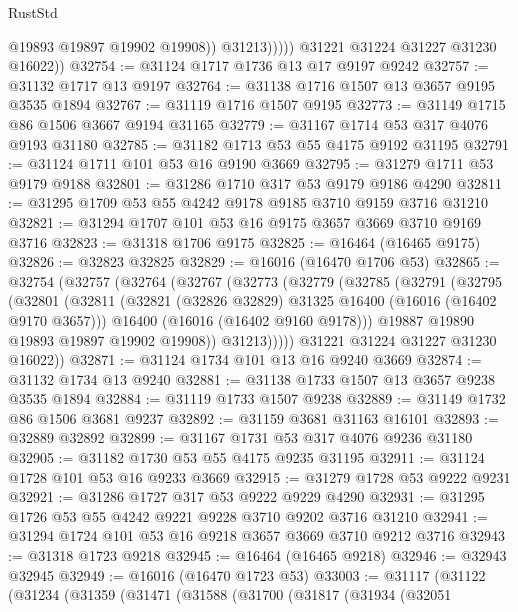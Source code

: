 \begin{lexlean}{RustStd}
\begin{coremodule}
                      @19893
                      @19897
                      @19902
                      @19908))
                  @31213)))))
        @31221
        @31224
        @31227
        @31230
        @16022))
@32754 := @31124 @1717 @1736 @13 @17 @9197 @9242
@32757 := @31132 @1717 @13 @9197
@32764 := @31138 @1716 @1507 @13 @3657 @9195 @3535 @1894
@32767 := @31119 @1716 @1507 @9195
@32773 := @31149 @1715 @86 @1506 @3667 @9194 @31165
@32779 := @31167 @1714 @53 @317 @4076 @9193 @31180
@32785 := @31182 @1713 @53 @55 @4175 @9192 @31195
@32791 := @31124 @1711 @101 @53 @16 @9190 @3669
@32795 := @31279 @1711 @53 @9179 @9188
@32801 := @31286 @1710 @317 @53 @9179 @9186 @4290
@32811 := @31295 @1709 @53 @55 @4242 @9178 @9185 @3710 @9159 @3716 @31210
@32821 := @31294 @1707 @101 @53 @16 @9175 @3657 @3669 @3710 @9169 @3716
@32823 := @31318 @1706 @9175
@32825 := @16464 (@16465 @9175)
@32826 := @32823 @32825
@32829 := @16016 (@16470 @1706 @53)
@32865 := @32754
    (@32757
      (@32764
        (@32767
          (@32773
            (@32779
              (@32785
                (@32791
                  (@32795
                    (@32801
                      (@32811
                        (@32821 (@32826 @32829) @31325 @16400 (@16016 (@16402 @9170 @3657)))
                        @16400
                        (@16016 (@16402 @9160 @9178)))
                      @19887
                      @19890
                      @19893
                      @19897
                      @19902
                      @19908))
                  @31213)))))
        @31221
        @31224
        @31227
        @31230
        @16022))
@32871 := @31124 @1734 @101 @13 @16 @9240 @3669
@32874 := @31132 @1734 @13 @9240
@32881 := @31138 @1733 @1507 @13 @3657 @9238 @3535 @1894
@32884 := @31119 @1733 @1507 @9238
@32889 := @31149 @1732 @86 @1506 @3681 @9237
@32892 := @31159 @3681 @31163 @16101
@32893 := @32889 @32892
@32899 := @31167 @1731 @53 @317 @4076 @9236 @31180
@32905 := @31182 @1730 @53 @55 @4175 @9235 @31195
@32911 := @31124 @1728 @101 @53 @16 @9233 @3669
@32915 := @31279 @1728 @53 @9222 @9231
@32921 := @31286 @1727 @317 @53 @9222 @9229 @4290
@32931 := @31295 @1726 @53 @55 @4242 @9221 @9228 @3710 @9202 @3716 @31210
@32941 := @31294 @1724 @101 @53 @16 @9218 @3657 @3669 @3710 @9212 @3716
@32943 := @31318 @1723 @9218
@32945 := @16464 (@16465 @9218)
@32946 := @32943 @32945
@32949 := @16016 (@16470 @1723 @53)
@33003 := @31117
    (@31122
      (@31234
        (@31359
          (@31471
            (@31588
              (@31700
                (@31817
                  (@31934
                    (@32051

\end{coremodule}
\end{lexlean}
